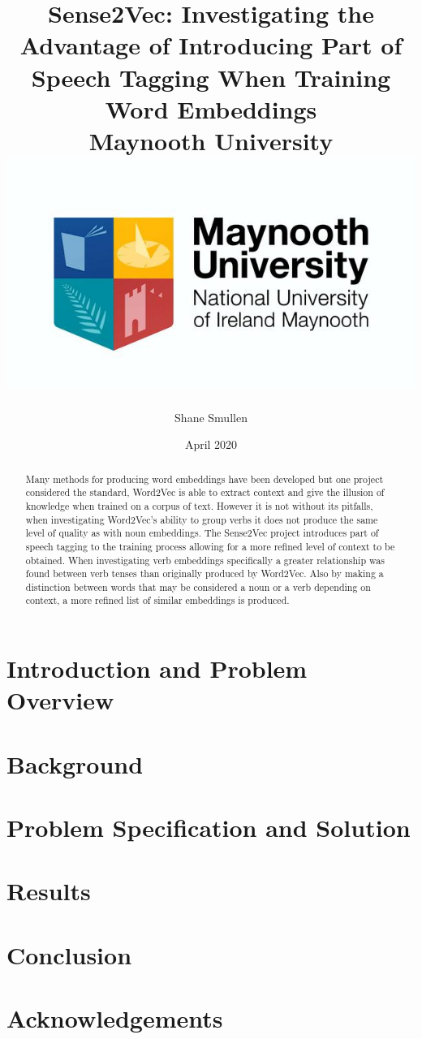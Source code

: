 \documentclass[12pt]{report}
\title{
    {Sense2Vec: Investigating the Advantage of Introducing Part of Speech Tagging When Training Word Embeddings}\\
    {\large Maynooth University}\\
    {\includegraphics[scale=0.5]{university}}
}
\author{Shane Smullen}
\date{April 2020}
\begin{document}
\maketitle

\begin{abstract}
Many methods for producing word embeddings have been developed but one project considered the standard, Word2Vec is able to extract context and give the illusion of knowledge when trained on a corpus of text. However it is not without its pitfalls, when investigating Word2Vec's ability to group verbs it does not produce the same level of quality as with noun embeddings. The Sense2Vec project introduces part of speech tagging to the training process allowing for a more refined level of context to be obtained. When investigating verb embeddings specifically a greater relationship was found between verb tenses than originally produced by Word2Vec. Also by making a distinction between words that may be considered a noun or a verb depending on context, a more refined list of similar embeddings is produced.
\end{abstract}

\tableofcontents

\chapter{Introduction and Problem Overview}


\chapter{Background}


\chapter{Problem Specification and Solution}


\chapter{Results}


\chapter{Conclusion}


 


\chapter*{Acknowledgements}

\end{document}
